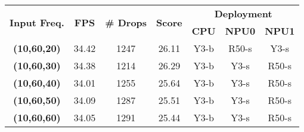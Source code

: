\begin{tabular}{ccccccc}
\hline 
\multirow{2}{*}{\textbf{Input Freq.}} & \multirow{2}{*}{\textbf{FPS}} & \multirow{2}{*}{\textbf{\# Drops}} & \multirow{2}{*}{\textbf{Score}} & \multicolumn{3}{c}{\textbf{Deployment}}\tabularnewline
\cline{5-7}
 &  &  &  & \textbf{CPU} & \textbf{NPU0} & \textbf{NPU1}\tabularnewline
\hline 
\textbf{(10,60,20)} & 34.42 & 1247 & 26.11 & Y3-b & R50-s & Y3-s\tabularnewline
\textbf{(10,60,30)} & 34.38 & 1214 & 26.29 & Y3-b & Y3-s & R50-s\tabularnewline
\textbf{(10,60,40)} & 34.01 & 1255 & 25.64 & Y3-b & Y3-s & R50-s\tabularnewline
\textbf{(10,60,50)} & 34.09 & 1287 & 25.51 & Y3-b & Y3-s & R50-s\tabularnewline
\textbf{(10,60,60)} & 34.05 & 1291 & 25.44 & Y3-b & Y3-s & R50-s\tabularnewline
\hline 
\end{tabular}
